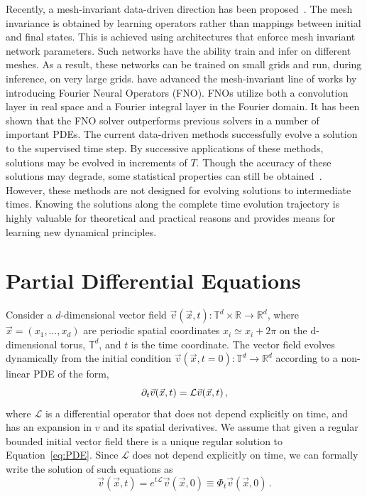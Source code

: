 \documentclass{article}
\theoremstyle{plain}
\theoremstyle{definition}
\theoremstyle{remark}
\begin{document}
Recently, a mesh-invariant data-driven direction has been proposed~\citep{DBLP:journals/corr/abs-1910-03193,nelsen2021random,anandkumar2020neural,patel2021physics}. The mesh invariance is obtained by learning operators rather than mappings between initial and final states.
This is achieved using architectures that enforce mesh invariant network parameters. Such networks have the ability train and infer on different meshes. As a result, these networks can be trained on small grids and run, during inference, on very large grids.
\citet{li2020fourier} have advanced the mesh-invariant line of works by introducing Fourier Neural Operators (FNO). FNOs utilize both a convolution layer in real space and a Fourier integral layer in the Fourier domain. It has been shown that the FNO solver outperforms previous solvers in a number of important PDEs. 
The current data-driven methods successfully evolve a solution to the supervised time step.
By successive applications of these methods, solutions may be evolved in increments of $T$. Though the accuracy of these solutions may degrade, some statistical properties can still be obtained~\citep{DBLP:journals/corr/abs-2106-06898}. 
However, these methods are not designed for evolving solutions to intermediate times.
Knowing the solutions along the complete time evolution trajectory is highly valuable for theoretical and practical reasons and provides means for learning new dynamical principles.

 

\section{Partial Differential Equations}

Consider a $d$-dimensional vector field $\vec{v} (\vec{x},t): {\mathbb T}^d\times {\mathbb R} \rightarrow {\mathbb R}^d$, where $\vec{x}=(x_1,\dots,x_d)$ are periodic spatial coordinates $x_i \simeq x_i + 2\pi$ on the d-dimensional torus, $\mathbb{T}^d$, and $t$ is the time coordinate. The vector field evolves dynamically from the initial condition $\vec{v}(\vec{x}, t=0): {\mathbb T}^d \rightarrow {\mathbb R}^d$ according to a non-linear PDE of the form,
\begin{equation}
    \partial_t \vec{v}(\vec{x},t) = {\cal L}\vec{v}(\vec{x},t) \,,
    \label{eq:PDE}
\end{equation}
where $\mathcal{L}$ is a differential operator that does not depend explicitly on time, and has an expansion in $v$ and its spatial derivatives. 
We assume that given a regular bounded initial vector field there is a unique regular solution to Equation~\eqref{eq:PDE}. Since $\mathcal{L}$ does not depend explicitly on time, we can formally write the solution of such equations as 
 \begin{equation}
  \vec{v}(\vec{x},t)=e^{t\mathcal{L}}\vec{v}(\vec{x},0) \equiv \Phi_t \vec{v}(\vec{x},0) \,.
  \label{evo}
 \end{equation}
\end{document}
